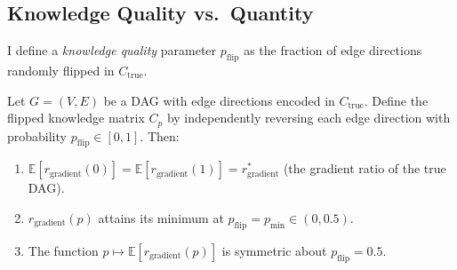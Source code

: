 \documentclass[twoside,11pt]{article}
\begin{document}
\subsection{Knowledge Quality vs.\ Quantity}
\label{sec:pflip}

I define a \emph{knowledge quality} parameter $p_{\mathrm{flip}}$ as
the fraction of edge directions randomly flipped in $C_{\mathrm{true}}$.

\begin{theorem}
\label{thm:u-shape}
Let $G=(V,E)$ be a DAG with edge directions encoded in
$C_{\mathrm{true}}$.  Define the flipped knowledge matrix
$C_p$ by independently reversing each edge direction with probability
$p_{\mathrm{flip}}\in[0,1]$.  Then:
\begin{enumerate}
\item[\emph{(i)}] $\mathbb{E}[r_{\mathrm{gradient}}(0)]
  = \mathbb{E}[r_{\mathrm{gradient}}(1)] = r_{\mathrm{gradient}}^*$
  (the gradient ratio of the true DAG).
\item[\emph{(ii)}] $r_{\mathrm{gradient}}(p)$ attains its minimum at
  $p_{\mathrm{flip}}=p_{\min}\in(0,0.5)$.
\item[\emph{(iii)}] The function $p\mapsto
  \mathbb{E}[r_{\mathrm{gradient}}(p)]$ is symmetric about
  $p_{\mathrm{flip}}=0.5$.
\end{enumerate}
\end{theorem}
\end{document}
